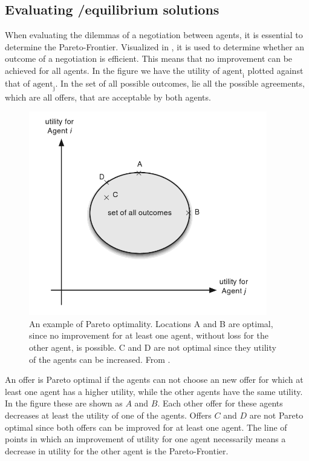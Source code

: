 \subsection{Evaluating /equilibrium solutions}
When evaluating the dilemmas of a negotiation between agents, it is essential to determine the Pareto-Frontier. Visualized in , it is used to determine whether an outcome of a negotiation is efficient. This means that no improvement can be achieved for all agents. In the figure we have the utility of $\text{agent}_\text{i}$ plotted against that of  $\text{agent}_\text{j}$. In the set of all possible outcomes, lie all the possible agreements, which are all offers, that are acceptable by both agents.

\begin{figure}[h]
	\centering
	\includegraphics[width=0.7\linewidth]{img/parito_optimal.png}
	\caption{An example of Pareto optimality. Locations A and B are optimal, since no improvement for at least one agent, without loss for the other agent, is possible. C and D are not optimal since they utility of the agents can be increased. From \citet{fatima2014principles}.}
	\label{fig:paritooptimal}
\end{figure}

An offer is Pareto optimal if the agents can not choose an new offer for which at least one agent has a higher utility, while the other agents have the same utility. In the figure these are shown as $A$ and $B$. Each other offer for these agents decreases at least the utility of one of the agents. Offers $C$ and $D$ are not Pareto optimal since both offers can be improved for at least one agent. The line of points in which an improvement of utility for one agent necessarily means a decrease in utility for the other agent is the Pareto-Frontier. 

